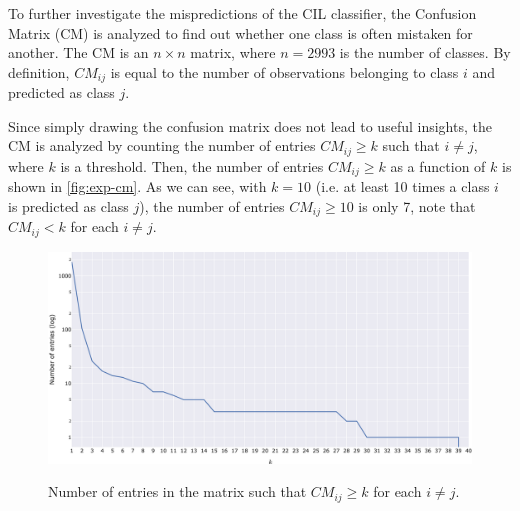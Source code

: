 To further investigate the mispredictions of the CIL classifier, the Confusion Matrix (CM) is analyzed to find out whether one class is often mistaken for another.
The CM is an $n \times n$ matrix, where $n = 2993$ is the number of classes.
By definition, $CM_{ij}$ is equal to the number of observations belonging to class $i$ and predicted as class $j$.

Since simply drawing the confusion matrix does not lead to useful insights, the CM is analyzed by counting the number of entries $CM_{ij} \geq k$ such that $i \neq j$, where $k$ is a threshold.
Then, the number of entries $CM_{ij} \geq k$ as a function of $k$ is shown in \autoref{fig:exp-cm}.
As we can see, with $k=10$ (i.e. at least 10 times a class $i$ is predicted as class $j$), the number of entries $CM_{ij} \geq 10$ is only 7, note that $CM_{ij} < k$ for each $i \neq j$.

\begin{figure}[H]
	\centering
    {\includegraphics[width=1\textwidth]{images/cm/cm_entry_plot.png} }%
    \caption{Number of entries in the matrix such that $CM_{ij} \geq k$ for each $i \neq j$.}
	\label{fig:exp-cm}
\end{figure}

